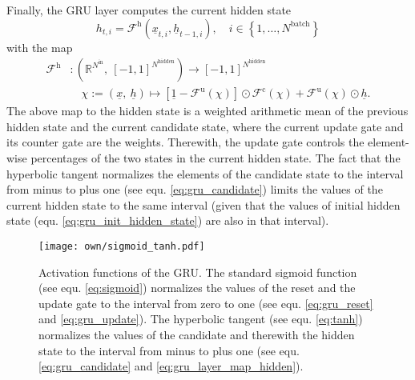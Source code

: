 Finally, the GRU layer computes the current hidden state
\begin{equation} \label{eq:gru_layer_current_hidden}
    h_{t,i}
    =
    \mathcal{F}^\text{h} \left( \underline x_{t,i}, \underline h_{t-1,i}\right)
    ,\quad i \in \left\{1, \dots, N^\text{batch}\right\}
\end{equation}
with the map
\begin{align} \label{eq:gru_layer_map_hidden}
    \mathcal{F}^\text{h}
    &:
    \left(
        \mathbb{R}^{N^\text{in}}
        ,\ 
        \left[-1, 1\right]^{N^\text{hidden}}
    \right)
    \rightarrow
    \left[-1, 1\right]^{N^\text{hidden}}
    \nonumber \\ & \quad
    \chi := \left(
        \underline x
        ,\ 
        \underline h
    \right)
    \mapsto 
    \left[
        \underline 1 
        -
        \mathcal{F}^\text{u}\left(\chi\right)
    \right]
    \odot
    \mathcal{F}^\text{c} \left(\chi\right)
    +
    \mathcal{F}^\text{u}\left(\chi\right)
    \odot
    \underline h
    .
\end{align}
The above map to the hidden state is a weighted arithmetic mean 
of the previous hidden state and the current candidate state, 
where the current update gate and its counter gate are the weights. 
Therewith, the update gate controls the element-wise percentages 
of the two states in the current hidden state. 
The fact that the hyperbolic tangent normalizes the elements 
of the candidate state to the interval from minus to plus one 
(see equ. \ref{eq:gru_candidate})
limits the values of the current hidden state to the same interval 
(given that the values of initial hidden state
(equ. \ref{eq:gru_init_hidden_state})
are also in that interval).
\begin{figure}
    \centering
    \texttt{[image: own/sigmoid\_tanh.pdf]}
    \caption[
        Activation functions of the GRU
    ]{
        Activation functions of the GRU.
        The standard sigmoid function
        (see equ. \ref{eq:sigmoid})
        normalizes the values
        of the reset and the update
        gate to the interval from zero to one
        (see equ. \ref{eq:gru_reset} and \ref{eq:gru_update}).
        The hyperbolic tangent
        (see equ. \ref{eq:tanh})
        normalizes the values 
        of the candidate
        and therewith the hidden state 
        to the interval from minus to plus one
        (see equ. \ref{eq:gru_candidate} and \ref{eq:gru_layer_map_hidden}).
        \label{fig:gru_activations}}
\end{figure}




